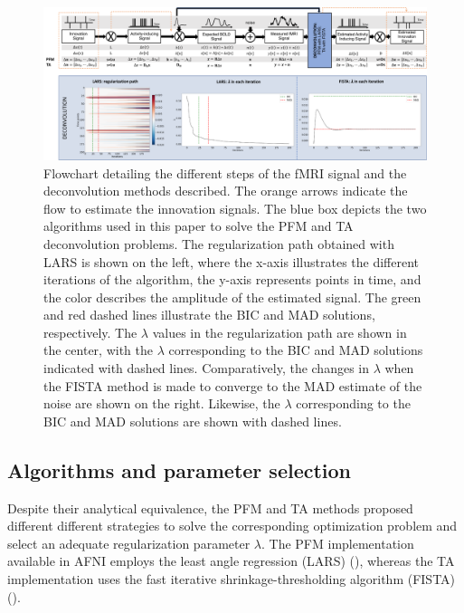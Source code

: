 \begin{figure}[t!]
    \begin{center}
        \includegraphics[width=\columnwidth]{figures/flowchart.pdf}
    \end{center}
    \caption{Flowchart detailing the different steps of the fMRI signal and the deconvolution methods described. The orange arrows indicate the flow to estimate the innovation signals. The blue box depicts the two algorithms used in this paper to solve the PFM and TA deconvolution problems. The regularization path obtained with LARS is shown on the left, where the x-axis illustrates the different iterations of the algorithm, the y-axis represents points in time, and the color describes the amplitude of the estimated signal. The green and red dashed lines illustrate the BIC and MAD solutions, respectively. The $\lambda$ values in the regularization path are shown in the center, with the $\lambda$ corresponding to the BIC and MAD solutions indicated with dashed lines. Comparatively, the changes in $\lambda$ when the FISTA method is made to converge to the MAD estimate of the noise are shown on the right. Likewise, the $\lambda$ corresponding to the BIC and MAD solutions are shown with dashed lines.}
\label{fig:flowchart}
\end{figure}

\subsection{Algorithms and parameter selection}
\label{sec:regparam}
Despite their analytical equivalence, the PFM and TA methods proposed different different strategies to solve the corresponding optimization problem and select an adequate regularization parameter $\lambda$. The PFM implementation available in AFNI employs the least angle regression (LARS) (\citealt{Efron2004Leastangleregression}), whereas the TA implementation uses the fast iterative shrinkage-thresholding algorithm (FISTA) (\citealt{Beck2009FastIterativeShrinkage}). 

